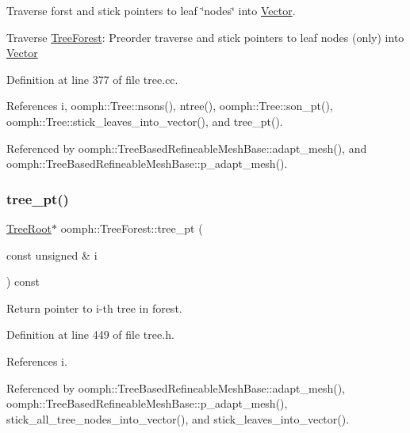 Traverse forst and stick pointers to leaf \char`\"{}nodes\char`\"{} into \hyperlink{classoomph_1_1Vector}{Vector}. 

Traverse \hyperlink{classoomph_1_1TreeForest}{Tree\+Forest}\+: Preorder traverse and stick pointers to leaf nodes (only) into \hyperlink{classoomph_1_1Vector}{Vector} 

Definition at line 377 of file tree.\+cc.



References i, oomph\+::\+Tree\+::nsons(), ntree(), oomph\+::\+Tree\+::son\+\_\+pt(), oomph\+::\+Tree\+::stick\+\_\+leaves\+\_\+into\+\_\+vector(), and tree\+\_\+pt().



Referenced by oomph\+::\+Tree\+Based\+Refineable\+Mesh\+Base\+::adapt\+\_\+mesh(), and oomph\+::\+Tree\+Based\+Refineable\+Mesh\+Base\+::p\+\_\+adapt\+\_\+mesh().

\mbox{\label{classoomph_1_1TreeForest_ab031414d924b1637cc4492c7048f3f7a}} 
\subsubsection{\texorpdfstring{tree\+\_\+pt()}{tree\_pt()}}
{\footnotesize\ttfamily \hyperlink{classoomph_1_1TreeRoot}{Tree\+Root}$\ast$ oomph\+::\+Tree\+Forest\+::tree\+\_\+pt (\begin{DoxyParamCaption}\item[{const unsigned \&}]{i }\end{DoxyParamCaption}) const\hspace{0.3cm}{\ttfamily [inline]}}



Return pointer to i-\/th tree in forest. 



Definition at line 449 of file tree.\+h.



References i.



Referenced by oomph\+::\+Tree\+Based\+Refineable\+Mesh\+Base\+::adapt\+\_\+mesh(), oomph\+::\+Tree\+Based\+Refineable\+Mesh\+Base\+::p\+\_\+adapt\+\_\+mesh(), stick\+\_\+all\+\_\+tree\+\_\+nodes\+\_\+into\+\_\+vector(), and stick\+\_\+leaves\+\_\+into\+\_\+vector().



